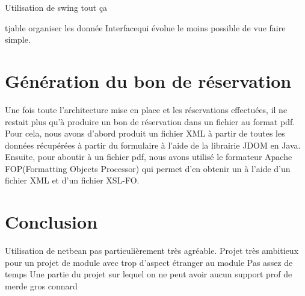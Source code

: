 \documentclass[11pt,a4paper]{article}
\begin{document}
Utilisation de swing tout ça



tjable organiser les donnée
Interfacequi évolue
le moins possible de vue
faire simple.

\section{Génération du bon de réservation}
Une fois toute l'architecture mise en place et les réservations effectuées, il
ne restait plus qu'à produire un bon de réservation dans un fichier au format
pdf.
Pour cela, nous avons d'abord produit un fichier XML à partir de toutes les
données récupérées à partir du formulaire à l'aide de la librairie JDOM en
Java. Ensuite, pour aboutir à un fichier pdf, nous avons utilisé le formateur
Apache FOP(Formatting Objects Processor) qui permet d'en obtenir un à l'aide
d'un fichier XML et d'un fichier XSL-FO.


\section{Conclusion}

Utilisation de netbean pas particulièrement très agréable. 
Projet très ambitieux pour un projet de module avec trop d'aspect étranger au module 
Pas assez de temps
Une partie du projet sur lequel on ne peut avoir aucun support
prof de merde
gros connard
\end{document}
